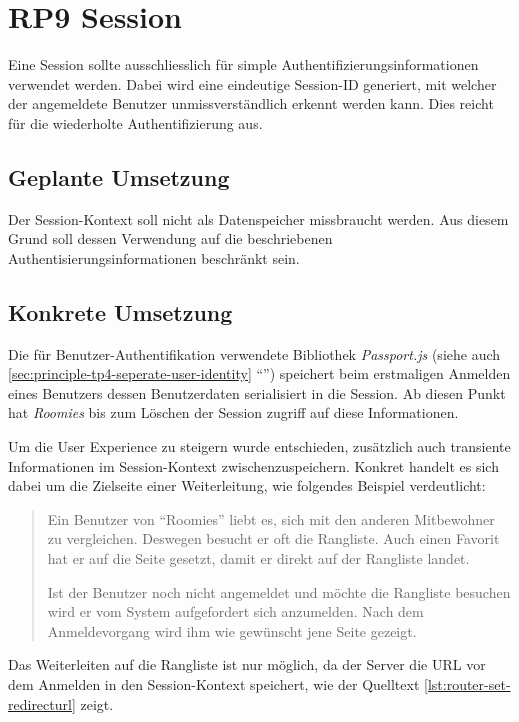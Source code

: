 \section{RP9 Session}
\label{sec:principle-rp9-session}

Eine Session sollte ausschliesslich für simple Authentifizierungsinformationen verwendet werden. Dabei wird eine eindeutige Session-ID generiert, mit welcher der angemeldete Benutzer unmissverständlich erkennt werden kann. Dies reicht für die wiederholte Authentifizierung aus.

\subsection*{Geplante Umsetzung}
Der Session-Kontext soll nicht als Datenspeicher missbraucht werden. Aus diesem Grund soll dessen Verwendung auf die beschriebenen Authentisierungsinformationen beschränkt sein.

\subsection*{Konkrete Umsetzung}
Die für Benutzer-Authentifikation verwendete Bibliothek \emph{Passport.js} \cite{Passportjs} (siehe auch \ref{sec:principle-tp4-seperate-user-identity} ``'') speichert beim erstmaligen Anmelden eines Benutzers dessen Benutzerdaten serialisiert in die Session. Ab diesen Punkt hat \emph{Roomies} bis zum Löschen der Session zugriff auf diese Informationen.

Um die User Experience zu steigern wurde entschieden, zusätzlich auch transiente Informationen im Session-Kontext zwischenzuspeichern. Konkret handelt es sich dabei um die Zielseite einer Weiterleitung, wie folgendes Beispiel verdeutlicht:

\begin{quotation}
Ein Benutzer von ``Roomies'' liebt es, sich mit den anderen Mitbewohner zu vergleichen. Deswegen besucht er oft die Rangliste. Auch einen Favorit hat er auf die Seite gesetzt, damit er direkt auf der Rangliste landet.

Ist der Benutzer noch nicht angemeldet und möchte die Rangliste besuchen wird er vom System aufgefordert sich anzumelden. Nach dem Anmeldevorgang wird ihm wie gewünscht jene Seite gezeigt.
\end{quotation}

Das Weiterleiten auf die Rangliste ist nur möglich, da der Server die \gls{URL} vor dem Anmelden in den Session-Kontext speichert, wie der Quelltext \ref{lst:router-set-redirecturl} zeigt.

